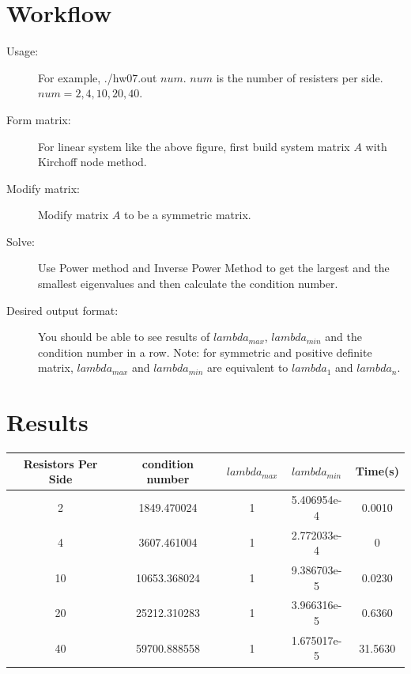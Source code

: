 \documentclass[12pt,a4paper]{article}
\begin{document}
\section{Workflow}

\begin{description}  

\item [Usage:] For example, ./hw07.out $num$. $num$ is the number of resisters per side. $num = 2, 4, 10, 20, 40$.
\item [Form matrix:] For linear system like the above figure, first build system matrix $A$ with Kirchoff node method.
\item [Modify matrix:] Modify matrix $A$ to be a symmetric matrix. 
\item [Solve:] Use Power method and Inverse Power Method to get the largest and the smallest eigenvalues and then calculate the condition number.
\item[Desired output format:] You should be able to see results of $lambda_{max}$, $lambda_{min}$ and the condition number in a row. Note: for symmetric and positive definite matrix, $lambda_{max}$ and $lambda_{min}$ are equivalent to $lambda_{1}$ and $lambda_{n}$.
\end{description}

\section{Results}

\begin{tabular}{|c|c|c|c|c|}
\hline  Resistors Per Side & condition number  &  $lambda_{max}$   & $lambda_{min}$ &  Time(s)  \\
\hline    2    			& 1849.470024 	& 1 		& 5.406954e-4 	& 0.0010    \\

\hline    4    			& 3607.461004 	& 1		 & 2.772033e-4  & 0     \\
\hline    10  			& 10653.368024 	& 1 		& 9.386703e-5 	& 0.0230      \\

\hline    20  			& 25212.310283 	& 1		& 3.966316e-5 	&  0.6360      \\

\hline    40  			& 59700.888558   	& 1		& 1.675017e-5	 &31.5630    \\\hline 
\end{tabular}
\end{document}

